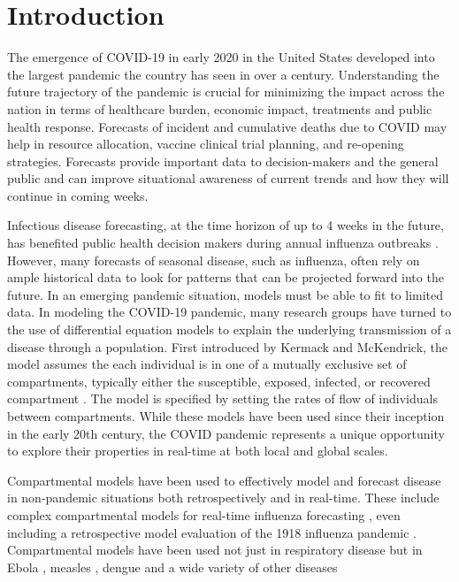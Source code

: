 \documentclass[11pt]{amsart}
\begin{document}

\section{Introduction}

The emergence of COVID-19 in early 2020 in the United States developed into the largest pandemic the country has seen in over a century. Understanding the future trajectory of the pandemic is crucial for minimizing the impact across the nation in terms of healthcare burden, economic impact, treatments and public health response. Forecasts of incident and cumulative deaths due to COVID may help in resource allocation, vaccine clinical trial planning, and re-opening strategies. Forecasts provide important data to decision-makers and the general public and can improve situational awareness of current trends and how they will continue in coming weeks. 

Infectious disease forecasting, at the time horizon of up to 4 weeks in the future, has benefited public health decision makers during annual influenza outbreaks \cite{lutz2019applying}\cite{myers2000forecasting}.  However, many forecasts of seasonal disease, such as influenza, often rely on ample historical data to look for patterns that can be projected forward into the future. In an emerging pandemic situation, models must be able to fit to limited data. In modeling the COVID-19 pandemic, many research groups have turned to the use of differential equation models to explain the underlying transmission of a disease through a population. First introduced by  Kermack and McKendrick, the model assumes the each individual is in one of a mutually exclusive set of compartments, typically either the susceptible, exposed, infected, or recovered compartment \cite{kermack1927contribution}. The model is specified by setting the rates of flow of individuals between compartments. While these models have been used since their inception in the early 20th century, the COVID pandemic represents a unique opportunity to explore their properties in real-time at both local and global scales.
 
Compartmental models have been used to effectively model and forecast disease in non-pandemic situations both retrospectively and in real-time. These include complex compartmental models for real-time influenza forecasting \cite{shaman2012forecasting}\cite{osthus2017forecasting}\cite{ong2010real}, even including a retrospective model evaluation of the 1918 influenza pandemic \cite{hall2007real}. Compartmental models have been used not just in respiratory disease but in Ebola \cite{lekone2006statistical}, measles \cite{bokler1993chaos}, dengue \cite{syafruddin2012seir} and a wide variety of other diseases
\end{document}
